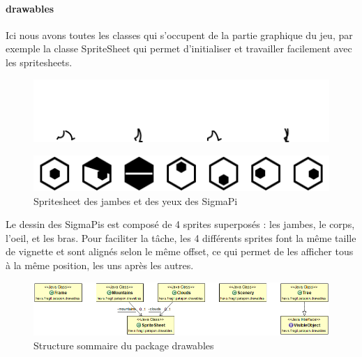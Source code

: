 \documentclass[a4paper,10pt]{article}
\begin{document}
  \paragraph{drawables}
  Ici nous avons toutes les classes qui s'occupent de la partie graphique du jeu, par exemple la classe SpriteSheet qui permet d'initialiser et travailler facilement avec les spritesheets.
 \begin{figure}[!h]
 \centering
 \vspace{-45pt}
 \includegraphics[scale=0.3]{images/legs}
 \end{figure}
  \begin{figure}[!h]
 \centering
 \includegraphics[scale=0.3]{images/eyes}
 \caption{Spritesheet des jambes et des yeux des SigmaPi}
 \end{figure}
 Le dessin des SigmaPis est composé de 4 sprites superposés : les jambes, le corps, l'oeil, et les bras. Pour faciliter la tâche, les 4 différents sprites font la même taille de vignette et sont alignés selon le même offset, ce qui permet de les afficher tous à la même position, les uns après les autres.
 \begin{figure}[!h]
 \centering
 \includegraphics[scale=0.4]{images/Drawables}
 \caption{Structure sommaire du package drawables}
 \end{figure}
\end{document}
